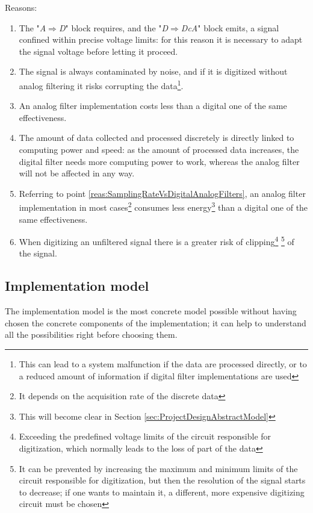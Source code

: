 \documentclass[a4paper, 10pt, final]{article} %
\begin{document}
    \nopagebreak
    \noindent Reasons:
    \begin{enumerate}[label=\emph{(\arabic*)}]
        \item The "\emph{A$\Rightarrow$D}" block requires, and the "\emph{D$\Rightarrow$DcA}" block emits, a signal confined within precise voltage limits: for this reason it is necessary to adapt the signal voltage before letting it proceed.
        \item The signal is always contaminated by noise, and if it is digitized without analog filtering it risks corrupting the data\footnote{This can lead to a system malfunction if the data are processed directly, or to a reduced amount of information if digital filter implementations are used}.
        \item An analog filter implementation costs less than a digital one of the same effectiveness.
        \item The amount of data collected and processed discretely is directly linked to computing power and speed: as the amount of processed data increases, the digital filter needs more computing power to work, whereas the analog filter will not be affected in any way. \label{reas:SamplingRateVsDigitalAnalogFilters}
        \item Referring to point \ref{reas:SamplingRateVsDigitalAnalogFilters}, an analog filter implementation in most cases\footnote{It depends on the acquisition rate of the discrete data} consumes less energy\footnote{This will become clear in Section \ref{sec:ProjectDesignAbstractModel}} than a digital one of the same effectiveness.
        \item When digitizing an unfiltered signal there is a greater risk of clipping\footnote{Exceeding the predefined voltage limits of the circuit responsible for digitization, which normally leads to the loss of part of the data} \footnote{It can be prevented by increasing the maximum and minimum limits of the circuit responsible for digitization, but then the resolution of the signal starts to decrease; if one wants to maintain it, a different, more expensive digitizing circuit must be chosen} of the signal.
    \end{enumerate}

    \subsection{Implementation model}\label{sec:ProjectDesignImplementationModel}
    The implementation model is the most concrete model possible without having chosen the concrete components of the implementation; it can help to understand all the possibilities right before choosing them.
\end{document}
